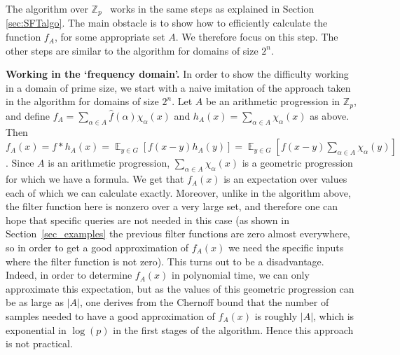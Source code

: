 \documentclass[11pt]{article}
\theoremstyle{definition}
\newcommand{\Z}{\mathbb{Z}}
\DeclareMathOperator*{\E}{\mathbb{E}}
\begin{document}
The algorithm over $\Z_p$~\cite{AGS}
works in the same steps as explained in Section \ref{sec:SFTalgo}. The main obstacle is to show how to efficiently calculate the function $f_A$, for some appropriate set $A$. We therefore focus on this step. The other steps are similar to the algorithm for domains of size $2^n$.

\noindent \textbf{Working in the `frequency domain'.} In order to show the difficulty working in a domain of prime size, we start with a naive imitation of the approach taken in the algorithm for domains of size $2^n$. Let $A$ be an arithmetic progression in $\Z_p$, and define $f_A = \sum_{\alpha\in A} \widehat{f}(\alpha)\chi_\alpha(x)$ and $h_A(x) = \sum_{\alpha \in A}\chi_\alpha(x)$ as above. Then $f_A(x) = f * h_A(x) = \E_{y \in G}\left[f(x-y)h_A(y)\right] = \E_{y \in G}\left[f(x-y)\sum_{\alpha \in A}\chi_\alpha(y)\right]$. Since $A$ is an arithmetic progression, $\sum_{\alpha \in A}\chi_\alpha(x)$ is a geometric progression for which we have a formula. We get that $f_A(x)$ is an expectation over values each of which we can calculate exactly. Moreover, unlike in the algorithm above, the filter function here is nonzero over a very large set, and therefore one can hope that specific queries are not needed in this case (as shown in Section~\ref{sec_examples} the previous filter functions are zero almost everywhere, so in order to get a good approximation of $f_A(x)$ we need the specific inputs where the filter function is not zero). This turns out to be a disadvantage. Indeed, in order to determine $f_A(x)$ in polynomial time, we can only approximate this expectation, but as the values of this geometric progression can be as large as $|A|$, one derives from the Chernoff bound that the number of samples needed to have a good approximation of $f_A(x)$ is roughly $|A|$, which is exponential in $\log(p)$ in the first stages of the algorithm.
Hence this approach is not practical.
\end{document}
